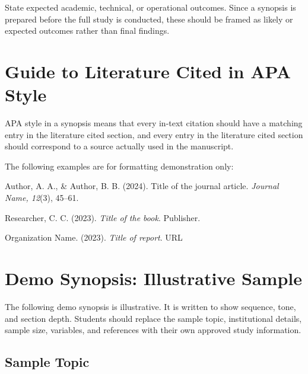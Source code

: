 \documentclass[11pt,a4paper]{article}
\begin{document}
State expected academic, technical, or operational outcomes. Since a synopsis is prepared before the full study is conducted, these should be framed as likely or expected outcomes rather than final findings.

\section{Guide to Literature Cited in APA Style}

\begin{definitionbox}
APA style in a synopsis means that every in-text citation should have a matching entry in the literature cited section, and every entry in the literature cited section should correspond to a source actually used in the manuscript.
\end{definitionbox}

\begin{examplebox}
The following examples are for formatting demonstration only:

Author, A. A., \& Author, B. B. (2024). Title of the journal article. \emph{Journal Name, 12}(3), 45--61.

Researcher, C. C. (2023). \emph{Title of the book}. Publisher.

Organization Name. (2023). \emph{Title of report}. URL
\end{examplebox}

\section{Demo Synopsis: Illustrative Sample}

\begin{conceptbox}
The following demo synopsis is illustrative. It is written to show sequence, tone, and section depth. Students should replace the sample topic, institutional details, sample size, variables, and references with their own approved study information.
\end{conceptbox}

\subsection{Sample Topic}
\end{document}
